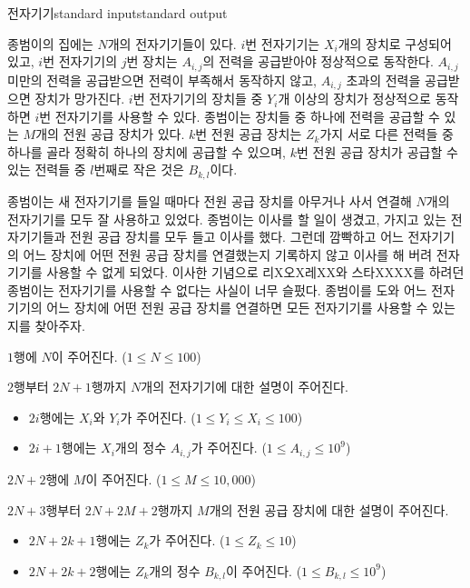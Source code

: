 \begin{problem}{전자기기}{standard input}{standard output}

종범이의 집에는 $N$개의 전자기기들이 있다. $i$번 전자기기는 $X_i$개의 장치로 구성되어 있고, $i$번 전자기기의 $j$번 장치는 $A_{i,j}$의 전력을 공급받아야 정상적으로 동작한다. $A_{i,j}$ 미만의 전력을 공급받으면 전력이 부족해서 동작하지 않고, $A_{i,j}$ 초과의 전력을 공급받으면 장치가 망가진다. $i$번 전자기기의 장치들 중 $Y_i$개 이상의 장치가 정상적으로 동작하면 $i$번 전자기기를 사용할 수 있다. 종범이는 장치들 중 하나에 전력을 공급할 수 있는 $M$개의 전원 공급 장치가 있다. $k$번 전원 공급 장치는 $Z_k$가지 서로 다른 전력들 중 하나를 골라 정확히 하나의 장치에 공급할 수 있으며, $k$번 전원 공급 장치가 공급할 수 있는 전력들 중 $l$번째로 작은 것은 $B_{k,l}$이다.

종범이는 새 전자기기를 들일 때마다 전원 공급 장치를 아무거나 사서 연결해 $N$개의 전자기기를 모두 잘 사용하고 있었다. 종범이는 이사를 할 일이 생겼고, 가지고 있는 전자기기들과 전원 공급 장치를 모두 들고 이사를 했다. 그런데 깜빡하고 어느 전자기기의 어느 장치에 어떤 전원 공급 장치를 연결했는지 기록하지 않고 이사를 해 버려 전자기기를 사용할 수 없게 되었다. 이사한 기념으로 리X오X레XX와 스타XXXX를 하려던 종범이는 전자기기를 사용할 수 없다는 사실이 너무 슬펐다. 종범이를 도와 어느 전자기기의 어느 장치에 어떤 전원 공급 장치를 연결하면 모든 전자기기를 사용할 수 있는지를 찾아주자.

\InputFile
$1$행에 $N$이 주어진다. ($1 \le N \le 100$)

$2$행부터 $2N+1$행까지 $N$개의 전자기기에 대한 설명이 주어진다.

\begin{itemize}
\item $2i$행에는 $X_i$와 $Y_i$가 주어진다. ($1 \le Y_i \le X_i \le 100$)
\item $2i+1$행에는 $X_i$개의 정수 $A_{i,j}$가 주어진다. ($1 \le A_{i,j} \le 10^9$)
\end{itemize}

$2N+2$행에 $M$이 주어진다. ($1 \le M \le 10,000$)

$2N+3$행부터 $2N+2M+2$행까지 $M$개의 전원 공급 장치에 대한 설명이 주어진다.

\begin{itemize}
\item $2N+2k+1$행에는 $Z_k$가 주어진다. ($1 \le Z_k \le 10$)
\item $2N+2k+2$행에는 $Z_k$개의 정수 $B_{k,l}$이 주어진다. ($1 \le B_{k,l} \le 10^9$)
\end{itemize}


\end{problem}
